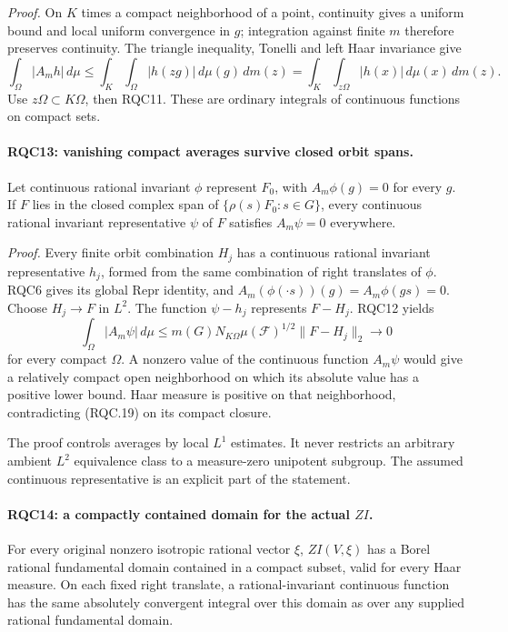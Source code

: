 \emph{Proof.}
On \(K\) times a compact neighborhood of a point, continuity
gives a uniform bound and local uniform convergence in \(g\);
integration against finite \(m\) therefore preserves continuity.
The triangle inequality, Tonelli and left Haar invariance give
\[
 \int_\Omega|A_mh|\,d\mu
 \le\int_K\int_\Omega|h(zg)|\,d\mu(g)\,dm(z)
 =\int_K\int_{z\Omega}|h(x)|\,d\mu(x)\,dm(z).
\]
Use \(z\Omega\subset K\Omega\), then RQC11.
These are ordinary integrals of continuous functions on compact
sets.

\paragraph{RQC13: vanishing compact averages survive closed orbit spans.}
\label{claim:RQC13}
Let continuous rational invariant \(\phi\) represent \(F_0\),
with \(A_m\phi(g)=0\) for every \(g\).
If \(F\) lies in the closed complex span of
\(\{\rho(s)F_0:s\in G\}\), every continuous rational invariant
representative \(\psi\) of \(F\) satisfies \(A_m\psi=0\) everywhere.

\emph{Proof.}
Every finite orbit combination \(H_j\) has a continuous rational
invariant representative \(h_j\), formed from the same combination
of right translates of \(\phi\).  RQC6 gives its global
\(\mathrm{Repr}\) identity, and
\(A_m(\phi(\cdot s))(g)=A_m\phi(gs)=0\).
Choose \(H_j\to F\) in \(L^2\).  The function \(\psi-h_j\)
represents \(F-H_j\).  RQC12 yields
\[
 \int_\Omega|A_m\psi|\,d\mu
 \le m(G)N_{K\Omega}\mu(\mathcal F)^{1/2}\|F-H_j\|_2
 \longrightarrow0
 \tag{RQC.19}
\]
for every compact \(\Omega\).  A nonzero value of the continuous
function \(A_m\psi\) would give a relatively compact open
neighborhood on which its absolute value has a positive lower
bound.  Haar measure is positive on that neighborhood, contradicting
(RQC.19) on its compact closure.

The proof controls averages by local \(L^1\) estimates.  It never
restricts an arbitrary ambient \(L^2\) equivalence class to a
measure-zero unipotent subgroup.  The assumed continuous
representative is an explicit part of the statement.

\paragraph{RQC14: a compactly contained domain for the actual \(ZI\).}
\label{claim:RQC14}
For every original nonzero isotropic rational vector \(\xi\),
\(ZI(V,\xi)\) has a Borel rational fundamental domain contained
in a compact subset, valid for every Haar measure.  On each fixed
right translate, a rational-invariant continuous function has the
same absolutely convergent integral over this domain as over any
supplied rational fundamental domain.

